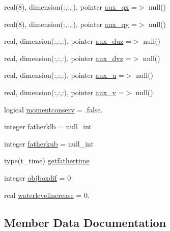 \begin{DoxyCompactItemize}
\item 
real(8), dimension(\+:,\+:,\+:), pointer \mbox{\hyperlink{structmodulehydrodynamic_1_1t__submodel_a074718d322b1676f818ba27155e35b51}{aux\+\_\+qx}} =$>$ null()
\item 
real(8), dimension(\+:,\+:,\+:), pointer \mbox{\hyperlink{structmodulehydrodynamic_1_1t__submodel_a93962bbbf3d4c2d7e8f9c12e29aa29ed}{aux\+\_\+qy}} =$>$ null()
\item 
real, dimension(\+:,\+:,\+:), pointer \mbox{\hyperlink{structmodulehydrodynamic_1_1t__submodel_aa9ce220d38b6fa3553296686b2ef9245}{aux\+\_\+duz}} =$>$ null()
\item 
real, dimension(\+:,\+:,\+:), pointer \mbox{\hyperlink{structmodulehydrodynamic_1_1t__submodel_a24eb9d3e29084b78ec68bd4b5f321432}{aux\+\_\+dvz}} =$>$ null()
\item 
real, dimension(\+:,\+:,\+:), pointer \mbox{\hyperlink{structmodulehydrodynamic_1_1t__submodel_a7bced5c572edf6bec261d65cde3e2867}{aux\+\_\+u}} =$>$ null()
\item 
real, dimension(\+:,\+:,\+:), pointer \mbox{\hyperlink{structmodulehydrodynamic_1_1t__submodel_a92dae5cb60df3db7eb6998b8b99a6346}{aux\+\_\+v}} =$>$ null()
\item 
logical \mbox{\hyperlink{structmodulehydrodynamic_1_1t__submodel_a1f67a49fbea01b1dab06dde4cc13451f}{momentconserv}} = .false.
\item 
integer \mbox{\hyperlink{structmodulehydrodynamic_1_1t__submodel_a3102de6cc488fc15cecbf321f4b6d27b}{fatherklb}} = null\+\_\+int
\item 
integer \mbox{\hyperlink{structmodulehydrodynamic_1_1t__submodel_ad712ccfcfbf3c95fd9477e9a31ee4562}{fatherkub}} = null\+\_\+int
\item 
type(t\+\_\+time) \mbox{\hyperlink{structmodulehydrodynamic_1_1t__submodel_a63303122d1e26e41f71b25296ba7add0}{getfathertime}}
\item 
integer \mbox{\hyperlink{structmodulehydrodynamic_1_1t__submodel_a201153cfc43c555a7397974228e08123}{objboxdif}} = 0
\item 
real \mbox{\hyperlink{structmodulehydrodynamic_1_1t__submodel_a5bc13f315bc0b55bf8054643b714c098}{waterlevelincrease}} = 0.
\end{DoxyCompactItemize}


\subsection{Member Data Documentation}
\mbox{\label{structmodulehydrodynamic_1_1t__submodel_aa9ce220d38b6fa3553296686b2ef9245}} 
